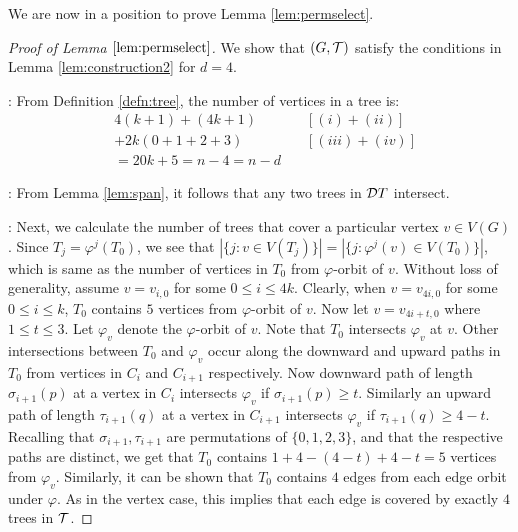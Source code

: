 \documentclass[11pt]{article}
\begin{document}
We are now in a position to prove Lemma \ref{lem:permselect}. 
\begin{proof}[Proof of Lemma $\ref{lem:permselect}$] 
We show that $(G,{\cal T})$ satisfy the conditions in Lemma
\ref{lem:construction2} for $d=4$.\smallskip

:
From Definition \ref{defn:tree}, the number of vertices in a tree is:
\begin{align*}
& 4(k+1) + (4k+1) & \quad [(i)+(ii)] \\
&+ 2k(0+1+2+3) & \quad [(iii) + (iv)] \\
&= 20k + 5 = n-4 = n-d & 
\end{align*}


: From Lemma \ref{lem:span}, it follows that any two trees in ${\cal D}T$
intersect.\smallskip

:
Next, we calculate the number of trees that cover a particular
vertex $v\in V(G)$. Since $T_j=\varphi^j(T_0)$, we see that $|\{j: v\in
V(T_j)\}|=|\{j: \varphi^j(v)\in V(T_0)\}|$, which is same as the number of
vertices in $T_0$ from $\varphi$-orbit of $v$. Without loss of generality,
assume $v=v_{i,0}$ for some $0\leq i\leq 4k$. Clearly, when $v=v_{4i,0}$
for some $0\leq i\leq k$, $T_0$ contains $5$ vertices from $\varphi$-orbit
of $v$. Now let $v=v_{4i+t,0}$ where $1\leq t\leq 3$. Let $\varphi_v$
denote the $\varphi$-orbit of $v$. Note that $T_0$
intersects $\varphi_v$ at $v$. Other intersections between $T_0$ and
$\varphi_v$ occur along the downward and upward paths in $T_0$ from
vertices in $C_i$ and $C_{i+1}$ respectively. Now downward path of
length $\sigma_{i+1}(p)$ at a vertex in $C_i$ intersects $\varphi_v$ if $\sigma_{i+1}(p)\geq t$. Similarly an upward path
of length $\tau_{i+1}(q)$ at a vertex in $C_{i+1}$ intersects $\varphi_v$ if $\tau_{i+1}(q)\geq 4-t$. Recalling that
$\sigma_{i+1},\tau_{i+1}$ are permutations of $\{0,1,2,3\}$, and that the
respective paths are distinct, we get that $T_0$ contains $1+4-(4-t)+4-t=5$
vertices from $\varphi_v$. Similarly, it can be shown that $T_0$ contains
$4$ edges from each edge orbit under $\varphi$. As in the vertex case, this
implies that each edge is covered by exactly $4$ trees in ${\cal
T}$.\smallskip


\end{proof}
\end{document}
